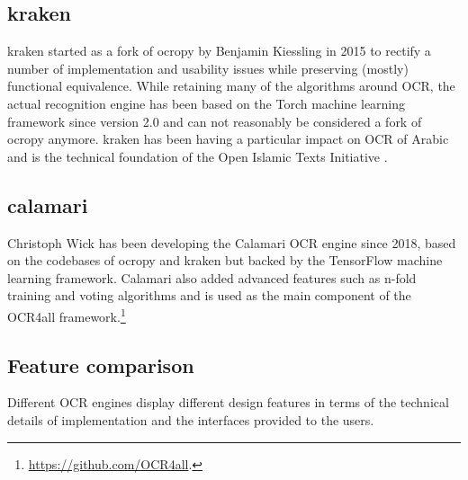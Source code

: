 \documentclass[conference]{IEEEtran}
\begin{document}

\subsection{kraken}

kraken \cite{DBLP:journals/corr/RomanovMSK17} started as a fork of ocropy
by Benjamin Kiessling in 2015 to rectify a number of implementation and usability
issues while preserving (mostly) functional equivalence. While retaining many of
the algorithms around OCR, the actual recognition engine has been based on the
Torch machine learning framework since version 2.0 and can not reasonably be
considered a fork of ocropy anymore. kraken has been having a particular impact
on OCR of Arabic and is the technical foundation of the Open Islamic Texts
Initiative \cite{miller_romanov_savant_2018}.


\subsection{calamari}

Christoph Wick has been developing the Calamari
\cite{DBLP:journals/corr/abs-1807-02004} OCR engine since 2018, based on the
codebases of ocropy and kraken but backed by the TensorFlow machine learning
framework. Calamari also added advanced features such as n-fold training and
voting algorithms and is used as the main component of the OCR4all
framework.\footnote{\url{https://github.com/OCR4all}.}

\subsection{Feature comparison}


Different OCR engines display different design features in terms of the
technical details of implementation and the interfaces provided to the users.
\end{document}
